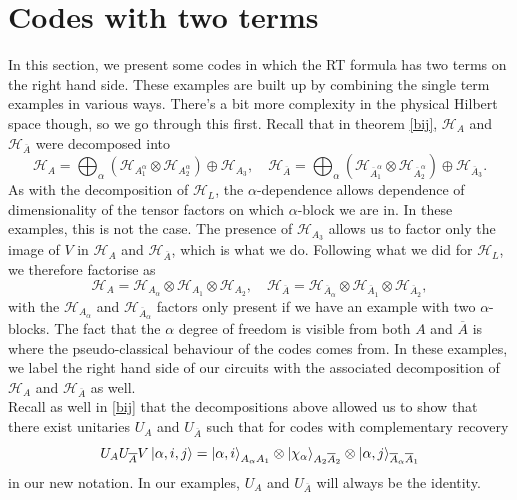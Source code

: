 \documentclass[12pt,a4paper]{report}
\numberwithin{equation}{section}
\newcommand{\ol}[1]{\overline{#1}}
\theoremstyle{definition}
\theoremstyle{theorem}
\theoremstyle{theorem}
\theoremstyle{example}
\theoremstyle{definition}
\begin{document}
\section{Codes with two terms}
In this section, we present some codes in which the RT formula has two terms on the right hand side. These examples are built up by combining the single term examples in various ways. There's a bit more complexity in the physical Hilbert space though, so we go through this first. Recall that in theorem \ref{bij}, $\mathcal{H}_{A}$ and $\mathcal{H}_{\ol{A}}$ were decomposed into
\begin{equation}
	\mathcal{H}_{A}=\bigoplus_{\alpha}\left(\mathcal{H}_{A_{1}^{\alpha}}\otimes\mathcal{H}_{A_{2}^{\alpha}}\right)\oplus\mathcal{H}_{A_{3}},\quad\mathcal{H}_{\ol{A}}=\bigoplus_{\alpha}\left(\mathcal{H}_{\ol{A}_{1}^{\alpha}}\otimes\mathcal{H}_{\ol{A}_{2}^{\alpha}}\right)\oplus\mathcal{H}_{\ol{A}_{3}}.
\end{equation}
As with the decomposition of $\mathcal{H}_{L}$, the $\alpha$-dependence allows dependence of dimensionality of the tensor factors on which $\alpha$-block we are in. In these examples, this is not the case. The presence of $\mathcal{H}_{A_{3}}$ allows us to factor only the image of $V$ in $\mathcal{H}_{A}$ and $\mathcal{H}_{\ol{A}}$, which is what we do. Following what we did for $\mathcal{H}_{L}$, we therefore factorise as
\begin{equation}
	\mathcal{H}_{A}=\mathcal{H}_{A_{\alpha}}\otimes\mathcal{H}_{A_{1}}\otimes\mathcal{H}_{A_{2}},\quad\mathcal{H}_{\ol{A}}=\mathcal{H}_{\ol{A}_{\alpha}}\otimes\mathcal{H}_{\ol{A}_{1}}\otimes\mathcal{H}_{\ol{A}_{2}},
\end{equation}
with the $\mathcal{H}_{A_{\alpha}}$ and $\mathcal{H}_{\ol{A}_{\alpha}}$ factors only present if we have an example with two $\alpha$-blocks. The fact that the $\alpha$ degree of freedom is visible from both $A$ and $\ol{A}$ is where the pseudo-classical behaviour of the codes comes from. In these examples, we label the right hand side of our circuits with the associated decomposition of $\mathcal{H}_{A}$ and $\mathcal{H}_{\ol{A}}$ as well.\\
Recall as well in \ref{bij} that the decompositions above allowed us to show that there exist unitaries $U_{A}$ and $U_{\ol{A}}$ such that for codes with complementary recovery
\begin{equation}\label{CR}
	U_{A}U_{\ol{A}}V\ket{\alpha,i,j}=\ket{\alpha,i}_{A_{\alpha}A_{1}}\otimes\ket{\chi_{\alpha}}_{A_{2}\ol{A}_{2}}\otimes\ket{\alpha,j}_{\ol{A}_{\alpha}\ol{A}_{1}}
\end{equation}
in our new notation. In our examples, $U_{A}$ and $U_{\ol{A}}$ will always be the identity.
\end{document}
